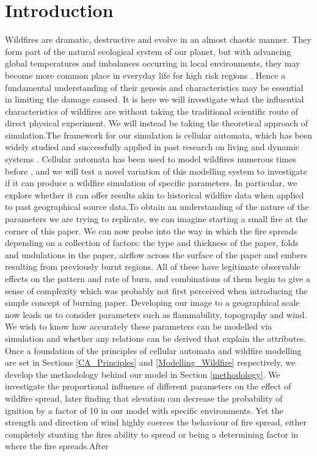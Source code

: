 \newpage
\section{Introduction} \label{introduction}

Wildfires are dramatic, destructive and evolve in an almost chaotic manner. They form part of the natural ecological system of our planet, but with advancing global temperatures and imbalances occurring in local environments, they may become more common place in everyday life for high risk regions \cite{JTAba_APWil}. Hence a fundamental understanding of their genesis and characteristics may be essential in limiting the damage caused. It is here we will investigate what the influential characteristics of wildfires are without taking the traditional scientific route of direct physical experiment. We will instead be taking the theoretical approach of simulation.\newline \indent The framework for our simulation is cellular automata, which has been widely studied and successfully applied in past research on living and dynamic systems \cite{CA_1,CA_2}. Cellular automata has been used to model wildfires numerous times before \cite{Aleksandridis_2008,CA-fire_2}, and we will test a novel variation of this modelling system to investigate if it can produce a wildfire simulation of specific parameters. In particular, we explore whether it can offer results akin to historical wildfire data when applied to past geographical source data.\newline \indent To obtain an understanding of the nature of the parameters we are trying to replicate, we can imagine starting a small fire at the corner of this paper. We can now probe into the way in which the fire spreads depending on a collection of factors: the type and thickness of the paper, folds and undulations in the paper, airflow across the surface of the paper and embers resulting from previously burnt regions. All of these have legitimate observable effects on the pattern and rate of burn, and combinations of them begin to give a sense of complexity which was probably not first perceived when introducing the simple concept of burning paper. \newline \indent Developing our image to a geographical scale now leads us to consider parameters such as flammability, topography and wind. We wish to know how accurately these parameters can be modelled via simulation and whether any relations can be derived that explain the attributes. Once a foundation of the principles of cellular automata and wildfire modelling are set in Sections \ref{CA_Principles} and \ref{Modelling_Wildfire} respectively, we develop the methodology behind our model in Section \ref{methodology}. We investigate the proportional influence of different parameters on the effect of wildfire spread, later finding that elevation can decrease the probability of ignition by a factor of 10 in our model with specific environments. Yet the strength and direction of wind highly coerces the behaviour of fire spread, either completely stunting the fires ability to spread or being a determining factor in where the fire spreads.\newline \indent After 